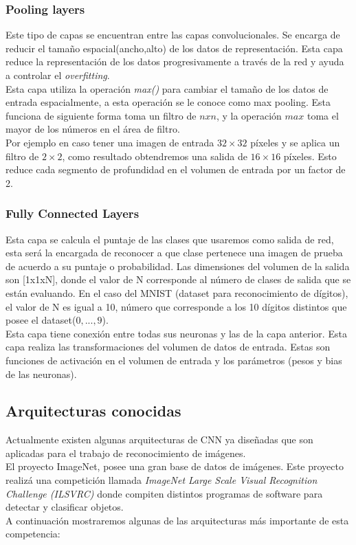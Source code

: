 \subsubsection{Pooling layers}
Este tipo de capas se encuentran entre las capas convolucionales. Se encarga de reducir el tamaño espacial(ancho,alto) de los datos de representación. Esta capa reduce la representación de los datos progresivamente a través de la red y ayuda a controlar el \textit{overfitting}.\\
Esta capa utiliza la operación \textit{max()} para cambiar el tamaño de los datos de entrada espacialmente, a esta operación se le conoce como max pooling. Esta funciona de siguiente forma toma un filtro de $n x n$, y la operación $max$ toma el mayor de los números en el área de filtro.\\ Por ejemplo en caso tener una imagen de entrada $32 \times 32$ píxeles y se aplica un filtro de $2\times2$, como resultado obtendremos una salida de $16\times16$ píxeles. Esto reduce cada segmento de profundidad en el volumen de entrada por un factor de 2.

\subsubsection{Fully Connected Layers}

Esta capa se calcula el puntaje de las clases que usaremos como salida de red, esta será la encargada de reconocer a que clase pertenece una imagen de prueba de acuerdo a su puntaje o probabilidad. Las dimensiones del volumen de la salida son [1x1xN], donde el valor de N corresponde al número de clases de salida que se están evaluando. En el caso del MNIST (dataset para reconocimiento de dígitos), el valor de N es igual a 10, número que corresponde a los 10 dígitos distintos que posee el dataset($0, ... ,9$).\\
Esta capa tiene conexión entre todas sus neuronas y las de la capa anterior. Esta capa realiza las transformaciones del volumen de datos de entrada. Estas son funciones de activación en el volumen de entrada y los parámetros (pesos y bias de las neuronas).
\vspace{2cm}
\subsection{Arquitecturas conocidas}
Actualmente existen algunas arquitecturas de CNN ya diseñadas que son aplicadas para el trabajo de reconocimiento de imágenes.\\ El proyecto ImageNet, posee una gran base de datos de imágenes. Este proyecto realizá una competición llamada \textit{ImageNet Large Scale Visual Recognition Challenge (ILSVRC) } donde compiten distintos programas de software para detectar y clasificar objetos.\\ A continuación mostraremos algunas de las arquitecturas más importante de esta competencia:


